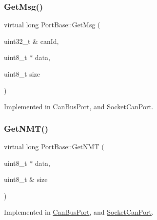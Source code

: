 \mbox{\label{classPortBase_a57e891d3992f70dea5c5e403350088be}} 
\subsubsection{\texorpdfstring{Get\+Msg()}{GetMsg()}}
{\footnotesize\ttfamily virtual long Port\+Base\+::\+Get\+Msg (\begin{DoxyParamCaption}\item[{uint32\+\_\+t \&}]{can\+Id,  }\item[{uint8\+\_\+t $\ast$}]{data,  }\item[{uint8\+\_\+t}]{size }\end{DoxyParamCaption})\hspace{0.3cm}{\ttfamily [pure virtual]}}



Implemented in \hyperlink{classCanBusPort_a13d6b06d93debc20b2f49aa8e7139988}{Can\+Bus\+Port}, and \hyperlink{classSocketCanPort_a4fe210160e70043ea78443630b9c4e86}{Socket\+Can\+Port}.

\mbox{\label{classPortBase_abab2bf17b01d87c2bca01cb2151aa2f1}} 
\subsubsection{\texorpdfstring{Get\+N\+M\+T()}{GetNMT()}}
{\footnotesize\ttfamily virtual long Port\+Base\+::\+Get\+N\+MT (\begin{DoxyParamCaption}\item[{uint8\+\_\+t $\ast$}]{data,  }\item[{uint8\+\_\+t \&}]{size }\end{DoxyParamCaption})\hspace{0.3cm}{\ttfamily [pure virtual]}}



Implemented in \hyperlink{classCanBusPort_a41242dc7980ca398e4770813e50ef32b}{Can\+Bus\+Port}, and \hyperlink{classSocketCanPort_a2efe27bd3bb8c8127c89925e1e21535a}{Socket\+Can\+Port}.

\mbox{\label{classPortBase_a45ec4a2cd5e17e098f6f72677437f066}} 
